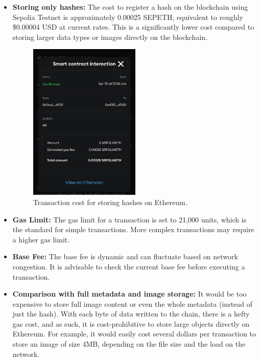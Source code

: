 \begin{itemize}
    \item \textbf{Storing only hashes:} The cost to register a hash on the blockchain using Sepolia Testnet is approximately 0.00025 SEPETH, equivalent to roughly \$0.00004 USD at current rates. 
    This is a significantly lower cost compared to storing larger data types or images directly on the blockchain.
    \begin{figure}
        \centering
        \includegraphics[width=0.5\textwidth]{images/gasFeeForRegisterHash.jpeg}
        \caption{Transaction cost for storing hashes on Ethereum.}
        \label{fig:gasFeeForRegisterHash}
    \end{figure}
    
    \item \textbf{Gas Limit:} The gas limit for a transaction is set to 21,000 units, which is the standard for simple transactions. More complex transactions may require a higher gas limit.
    \item \textbf{Base Fee:} The base fee is dynamic and can fluctuate based on network congestion. It is advisable to check the current base fee before executing a transaction.
    \item \textbf{Comparison with full metadata and image storage:} It would be too expensive to store full image content or even the whole metadata (instead of just the hash). With each byte of data written to the chain, there is a hefty gas cost, and as such, it is cost-prohibitive to store large objects directly on Ethereum. For example, it would easily cost several dollars per transaction to store an image of size 4MB, depending on the file size and the load on the network.
\end{itemize}

